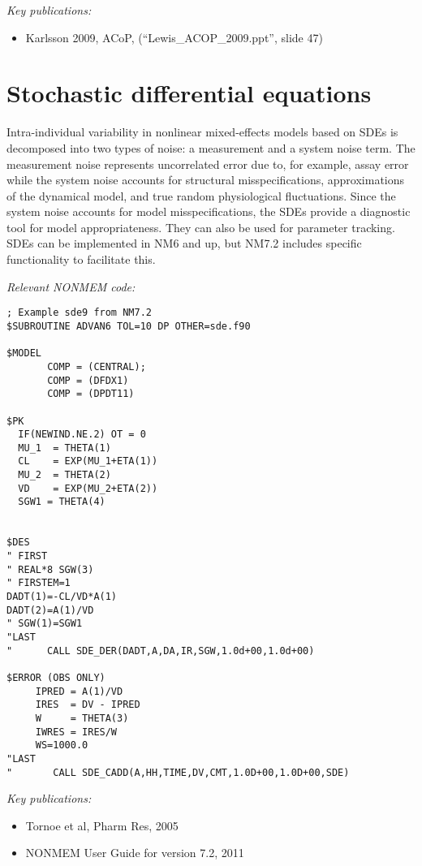 \documentclass[a4paper,11pt]{article}
\begin{document}
\noindent \emph{Key publications:}
\begin{itemize}
\item Karlsson 2009, ACoP, (“Lewis\_ACOP\_2009.ppt”, slide 47)
\end{itemize}

\section{Stochastic differential equations}
Intra-individual variability in nonlinear mixed-effects models based
on SDEs is decomposed into two types of noise: a measurement and a
system noise term. The measurement noise represents uncorrelated error
due to, for example, assay error while the system noise accounts for
structural misspecifications, approximations of the dynamical model,
and true random physiological fluctuations. Since the system noise
accounts for model misspecifications, the SDEs provide a diagnostic
tool for model appropriateness. They can also be used for parameter
tracking. SDEs can be implemented in NM6 and up, but NM7.2 includes
specific functionality to facilitate this.

\vspace{10pt}
\noindent \emph{Relevant NONMEM code:}
{\small
\begin{lstlisting}
; Example sde9 from NM7.2
$SUBROUTINE ADVAN6 TOL=10 DP OTHER=sde.f90

$MODEL
       COMP = (CENTRAL);
       COMP = (DFDX1)
       COMP = (DPDT11)

$PK
  IF(NEWIND.NE.2) OT = 0
  MU_1  = THETA(1)
  CL    = EXP(MU_1+ETA(1))
  MU_2  = THETA(2)
  VD    = EXP(MU_2+ETA(2))
  SGW1 = THETA(4)


$DES
" FIRST
" REAL*8 SGW(3)
" FIRSTEM=1
DADT(1)=-CL/VD*A(1)
DADT(2)=A(1)/VD
" SGW(1)=SGW1
"LAST
"      CALL SDE_DER(DADT,A,DA,IR,SGW,1.0d+00,1.0d+00)

$ERROR (OBS ONLY)
     IPRED = A(1)/VD
     IRES  = DV - IPRED
     W     = THETA(3)
     IWRES = IRES/W
     WS=1000.0
"LAST
"       CALL SDE_CADD(A,HH,TIME,DV,CMT,1.0D+00,1.0D+00,SDE)
\end{lstlisting}
}

\noindent \emph{Key publications:}
\begin{itemize}
\item Tornoe et al, Pharm Res, 2005
\item NONMEM User Guide for version 7.2, 2011
\end{itemize}
\end{document}

